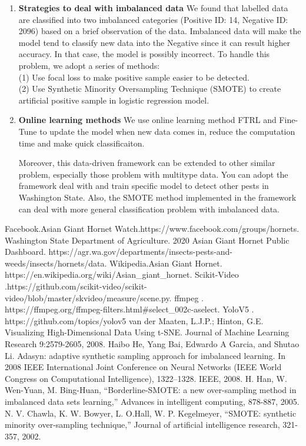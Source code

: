 \documentclass[12pt]{article}
\begin{document}
	\begin{enumerate}[\bf 1.]
		\item \textbf{Strategies to deal with imbalanced data}
		We found that labelled data are classified into two imbalanced categories (Positive ID: 14, Negative ID: 2096) based on a brief observation of the data. Imbalanced data will make the model tend to classify new data into the Negative since it can result higher accuracy. In that case, the model is possibly incorrect. To handle this problem, we adopt a series of methods:\\
		(1) Use focal loss to make positive sample easier to be detected.\\
		(2) Use Synthetic Minority Oversampling Technique (SMOTE) to create artificial positive sample in logistic regression model.
		\item \textbf{Online learning methods}
		We use online learning method FTRL and Fine-Tune to update the model when new data comes in, reduce the computation time and make quick classificaiton.
		
		
		Moreover, this data-driven framework can be extended to other similar problem, especially those problem with multitype data. You can adopt the framework deal with and train specific model to detect other pests in Washington State. Also, the SMOTE method implemented in the framework can deal with more general classification problem with imbalanced data.
	\end{enumerate}
		
\clearpage
\begin{thebibliography}{99}
	Facebook.Asian Giant Hornet Watch.https://www.facebook.com/groups/hornets.
	Washington State Department of Agriculture. 2020 Asian Giant Hornet Public 
	Dashboard. https://agr.wa.gov/departments/insects-pests-and-weeds/insects/hornets/data.
	Wikipedia.Asian Giant Hornet. https://en.wikipedia.org/wiki/Asian\_giant\_hornet.
	Scikit-Video .https://github.com/scikit-video/scikit-video/blob/master/skvideo/measure/scene.py.
	ffmpeg . https://ffmpeg.org/ffmpeg-filters.html\#select\_002c-aselect.
	YoloV5 . https://github.com/topics/yolov5
	van der Maaten, L.J.P.; Hinton, G.E. Visualizing High-Dimensional Data Using t-SNE. Journal of Machine Learning Research 9:2579-2605, 2008.
	Haibo He, Yang Bai, Edwardo A Garcia, and Shutao Li. Adasyn: adaptive synthetic sampling approach for imbalanced learning. In 2008 IEEE International Joint Conference on Neural Networks (IEEE World Congress on Computational Intelligence), 1322–1328. IEEE, 2008.
	H. Han, W. Wen-Yuan, M. Bing-Huan, “Borderline-SMOTE: a new over-sampling method in imbalanced data sets learning,” Advances in intelligent computing, 878-887, 2005.
	N. V. Chawla, K. W. Bowyer, L. O.Hall, W. P. Kegelmeyer, “SMOTE: synthetic minority over-sampling technique,” Journal of artificial intelligence research, 321-357, 2002.
\end{thebibliography}
\end{document}
